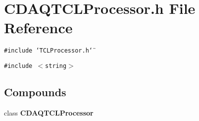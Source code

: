 \section{CDAQTCLProcessor.h File Reference}
\label{CDAQTCLProcessor_8h}
{\tt \#include \char`\"{}TCLProcessor.h\char`\"{}}\par
{\tt \#include $<$string$>$}\par
\subsection*{Compounds}
\begin{CompactItemize}
\item 
class {\bf CDAQTCLProcessor}
\end{CompactItemize}
